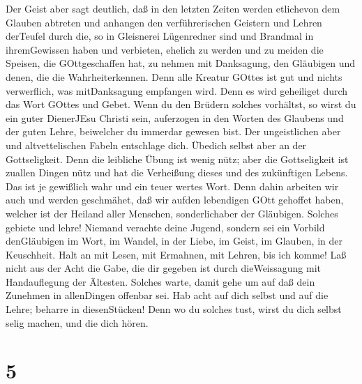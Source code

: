  Der Geist aber sagt deutlich, daß in den letzten Zeiten
werden etlichevon dem Glauben abtreten und anhangen den verführerischen
Geistern und Lehren derTeufel  durch die, so in Gleisnerei
Lügenredner sind und Brandmal in ihremGewissen haben  und
verbieten, ehelich zu werden und zu meiden die Speisen, die
GOttgeschaffen hat, zu nehmen mit Danksagung, den Gläubigen und denen,
die die Wahrheiterkennen.  Denn alle Kreatur GOttes ist gut
und nichts verwerflich, was mitDanksagung empfangen wird. 
Denn es wird geheiliget durch das Wort GOttes und Gebet. 
Wenn du den Brüdern solches vorhältst, so wirst du ein guter DienerJEsu
Christi sein, auferzogen in den Worten des Glaubens und der guten Lehre,
beiwelcher du immerdar gewesen bist.  Der ungeistlichen aber
und altvettelischen Fabeln entschlage dich. Übedich selbst aber an der
Gottseligkeit.  Denn die leibliche Übung ist wenig nütz;
aber die Gottseligkeit ist zuallen Dingen nütz und hat die Verheißung
dieses und des zukünftigen Lebens.  Das ist je gewißlich
wahr und ein teuer wertes Wort.  Denn dahin arbeiten wir
auch und werden geschmähet, daß wir aufden lebendigen GOtt gehoffet
haben, welcher ist der Heiland aller Menschen, sonderlichaber der
Gläubigen.  Solches gebiete und lehre! 
Niemand verachte deine Jugend, sondern sei ein Vorbild denGläubigen im
Wort, im Wandel, in der Liebe, im Geist, im Glauben, in der Keuschheit.
 Halt an mit Lesen, mit Ermahnen, mit Lehren, bis ich
komme!  Laß nicht aus der Acht die Gabe, die dir gegeben
ist durch dieWeissagung mit Handauflegung der Ältesten. 
Solches warte, damit gehe um auf daß dein Zunehmen in allenDingen
offenbar sei.  Hab acht auf dich selbst und auf die Lehre;
beharre in diesenStücken! Denn wo du solches tust, wirst du dich selbst
selig machen, und die dich hören.

\hypertarget{section-4}{%
\section{5}\label{section-4}}

